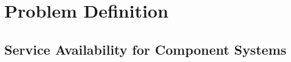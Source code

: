 \begin{comment}
heterogeneous sensor platform where the level of resource constrains would be
different as some are designed for doing very specific job (such as sensor
motes), some were designed for handling large traffic and relaying messages
(such as gateway), the sensor network will each be connected to different types
network interfaces, and will have different types of sensors connected. The
complexity involved grows exponentially high.

, subject to unreliable network, high risk of node failures, and expected
to run unattended for a long period of time, several work have been proposing
lightweight component models to ease the development and deployment for WSN
applications.

problem is to separate applications into components where each will be
encapsulated into a single unit of operation that could be mapped into
low-level hardware functions running on the sensor
nodes\cite{Hughes2012}\cite{Taherkordi2010}.

However, as most work in this field of research assume homogeneous sensor
platforms and application requirements, fault tolerant solution for one
application cannot be extended to other applications. The chance of reusability
in those solutions among applications is still low.

Advances in sensor, radio technology and programming tools in recent years
enables rapid development of complex WSN applications on heterogeneous sensor
platforms, however, as current architectures are built around the idea of
a long deployment cycle, rapid redeployment is nearly impossible execute.

By bringing component based middleware to the playground, we could decouple
application logic and actual implementation easily, fault tolerance can be
broken down into several components which can be reused in different stage of
the deployment.

\end{comment}

\section{Problem Definition}

\subsection{Service Availability for Component Systems}

